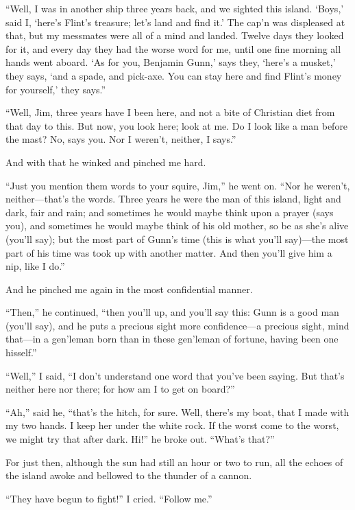 \enquote{Well, I was in another ship three years back, and we sighted this island. \enquote{Boys,} said I, \enquote{here’s Flint’s treasure; let’s land and find it.} The cap’n was displeased at that, but my messmates were all of a mind and landed. Twelve days they looked for it, and every day they had the worse word for me, until one fine morning all hands went aboard. \enquote{As for you, Benjamin Gunn,} says they, \enquote{here’s a musket,} they says, \enquote{and a spade, and pick-axe. You can stay here and find Flint’s money for yourself,} they says.}

\enquote{Well, Jim, three years have I been here, and not a bite of Christian diet from that day to this. But now, you look here; look at me. Do I look like a man before the mast? No, says you. Nor I weren’t, neither, I says.}

And with that he winked and pinched me hard.

\enquote{Just you mention them words to your squire, Jim,} he went on. \enquote{Nor he weren’t, neither---that’s the words. Three years he were the man of this island, light and dark, fair and rain; and sometimes he would maybe think upon a prayer (says you), and sometimes he would maybe think of his old mother, so be as she’s alive (you’ll say); but the most part of Gunn’s time (this is what you’ll say)---the most part of his time was took up with another matter. And then you’ll give him a nip, like I do.}

And he pinched me again in the most confidential manner.

\enquote{Then,} he continued, \enquote{then you’ll up, and you’ll say this: Gunn is a good man (you’ll say), and he puts a precious sight more confidence---a precious sight, mind that---in a gen’leman born than in these gen’leman of fortune, having been one hisself.}

\enquote{Well,} I said, \enquote{I don’t understand one word that you’ve been saying. But that’s neither here nor there; for how am I to get on board?}

\enquote{Ah,} said he, \enquote{that’s the hitch, for sure. Well, there’s my boat, that I made with my two hands. I keep her under the white rock. If the worst come to the worst, we might try that after dark. Hi!} he broke out. \enquote{What’s that?}

For just then, although the sun had still an hour or two to run, all the echoes of the island awoke and bellowed to the thunder of a cannon.

\enquote{They have begun to fight!} I cried. \enquote{Follow me.}


